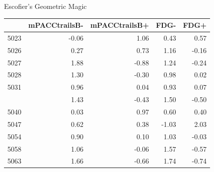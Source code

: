 \documentclass[
  ignorenonframetext,
]{beamer}
\begin{document}
\begin{frame}{Escofier's Geometric Magic}
\protect\hypertarget{escofiers-geometric-magic-1}{}

\begin{table}[H]
\centering\begingroup\fontsize{7}{9}\selectfont

\begin{tabular}{lrrrr}
\toprule
  & mPACCtrailsB- & mPACCtrailsB+ & FDG- & FDG+\\
\midrule
5023 & -0.06 & 1.06 & 0.43 & 0.57\\
5026 & 0.27 & 0.73 & 1.16 & -0.16\\
5027 & 1.88 & -0.88 & 1.24 & -0.24\\
5028 & 1.30 & -0.30 & 0.98 & 0.02\\
5031 & 0.96 & 0.04 & 0.93 & 0.07\\
\addlinespace
5037 & 1.43 & -0.43 & 1.50 & -0.50\\
5040 & 0.03 & 0.97 & 0.60 & 0.40\\
5047 & 0.62 & 0.38 & -1.03 & 2.03\\
5054 & 0.90 & 0.10 & 1.03 & -0.03\\
5058 & 1.06 & -0.06 & 1.57 & -0.57\\
5063 & 1.66 & -0.66 & 1.74 & -0.74\\
\bottomrule
\end{tabular}\endgroup{}
\end{table}

\end{frame}
\end{document}
